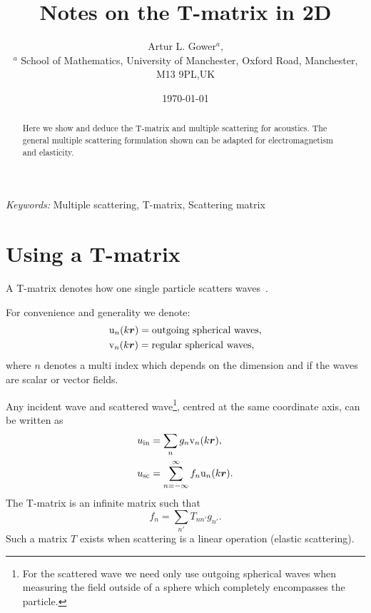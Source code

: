 \documentclass[ 12pt, a4paper]{article}
\begin{document}
\title{Notes on the T-matrix in 2D}
\author{
Artur L. Gower$^{a}$,\\
\footnotesize{$^{a}$ School of Mathematics, University of Manchester, Oxford Road, Manchester, M13 9PL,UK}
}
\date{\today}
\maketitle

\begin{abstract}
Here we show and deduce the T-matrix and multiple scattering for acoustics. The general multiple scattering formulation shown can be adapted for electromagnetism and elasticity.
\end{abstract}

\noindent
{\textit{Keywords:} Multiple scattering, T-matrix, Scattering matrix}

\section{Using a T-matrix}
A T-matrix denotes how one single particle scatters waves~\parencite{ganesh_far-field_2010,ganesh_algorithm_2017}.

For convenience and generality we denote:
\begin{equation}
\begin{aligned}
    & \mathrm u_{n}(k\boldsymbol{r}) = \text{outgoing spherical waves},
    \label{eqn:outgoing_waves_and_regular_waves}
    \\
    & \mathrm v_{n}(k\boldsymbol{r})= \text{regular spherical waves},
 \end{aligned}
\end{equation}
where $n$ denotes a multi index which depends on the dimension and if the waves are scalar or vector fields.

Any incident wave and scattered wave\footnote{For the scattered wave we need only use outgoing spherical waves when measuring the field outside of a sphere which completely encompasses the particle.}, centred at the same coordinate axis, can be written as
\begin{align}
  & u_{\mathrm{in}} = \sum_{n} g_n \mathrm v_{n}(k\boldsymbol{r}),
  \\
  & u_{\mathrm{sc}} = \sum_{n=-\infty}^\infty f_n \mathrm u_{n}(k\boldsymbol{r}).
\end{align}
The T-matrix is an infinite matrix such that
\begin{equation}
  f_n = \sum_{n'} T_{nn'} g_{n'}.
\end{equation}
Such a matrix $T$ exists when scattering is a linear operation (elastic scattering).
\end{document}
